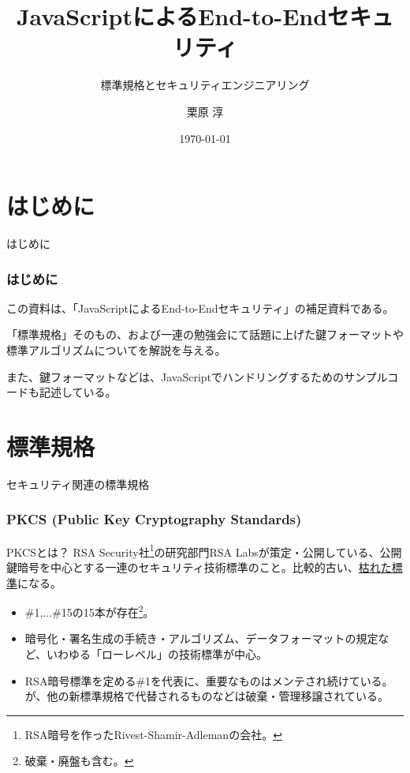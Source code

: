 \documentclass[12pt,dvipdfmx]{beamer}
\title[E2E Security with JS Appendix]{JavaScriptによるEnd-to-Endセキュリティ}
\subtitle{標準規格とセキュリティエンジニアリング}
\author[Jun Kurihara]{栗原 淳}
\institute[]{}
\date[\today]{\today}
\begin{document}
\begin{frame}
\titlepage
\end{frame}

\section{はじめに}
\begin{frame}
 \centering
 {\Large はじめに}
\end{frame}

\begin{frame}
\frametitle{はじめに}
この資料は、「JavaScriptによるEnd-to-Endセキュリティ」の補足資料である。

「標準規格」そのもの、および一連の勉強会にて話題に上げた鍵フォーマットや標準アルゴリズムについてを解説を与える。

また、鍵フォーマットなどは、JavaScriptでハンドリングするためのサンプルコードも記述している。
\end{frame}

\section{標準規格}
\begin{frame}
\centering
 {\Large セキュリティ関連の標準規格}
\end{frame}

\begin{frame}
\frametitle{PKCS (Public Key Cryptography Standards)}
\begin{block}{PKCSとは？}
RSA Security社\footnote[frame]{\scriptsize RSA暗号を作ったRivest-Shamir-Adlemanの会社。}の研究部門RSA Labsが策定・公開している、公開鍵暗号を中心とする一連のセキュリティ技術標準のこと。比較的古い、\underline{枯れた標準}になる。
\end{block}
\begin{itemize}
 \item \#1,...\#15の15本が存在\footnote[frame]{\scriptsize 破棄・廃盤も含む。}。
 \item 暗号化・署名生成の手続き・アルゴリズム、データフォーマットの規定など、いわゆる「ローレベル」の技術標準が中心。
 \item RSA暗号標準を定める\#1を代表に、重要なものはメンテされ続けている。が、他の新標準規格で代替されるものなどは破棄・管理移譲されている。
\end{itemize}
\end{frame}
\end{document}
